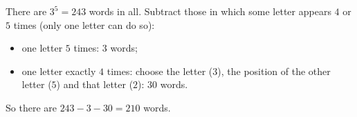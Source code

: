 There are $3^5=243$ words in all. Subtract those in which some letter appears $4$ or $5$ times (only one letter can do so):
\begin{itemize}
\item one letter $5$ times: $3$ words;
\item one letter exactly $4$ times: choose the letter ($3$), the position of the other letter ($5$) and that letter ($2$): $30$ words.
\end{itemize}
So there are $243-3-30=\boxed{210}$ words.
